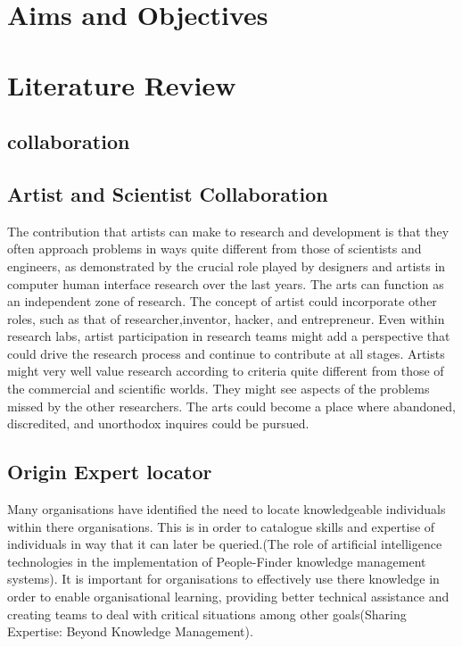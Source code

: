 \documentclass[a4paper,oneside,11pt]{report}
\begin{document}
\tableofcontents


\chapter{Aims and Objectives}
\chapter{Literature Review}
\section{collaboration}
\section{Artist and Scientist Collaboration}
The contribution that artists can make to research and development is that they often
approach problems in ways quite different from those of scientists and engineers, as
demonstrated by the crucial role played by designers and artists in computer human
interface research over the last years. The arts can function as an independent zone of
research. The concept of artist could incorporate other roles, such as that of researcher,inventor, hacker, and entrepreneur. Even within research labs, artist participation in
research teams might add a perspective that could drive the research process and continue
to contribute at all stages. Artists might very well value research according to criteria quite different from those of the commercial and scientiﬁc worlds. They might see aspects of the problems missed by the other researchers. The arts could become a place where abandoned, discredited,
and unorthodox inquires could be pursued.
\section{Origin Expert locator}
Many organisations have identified the need to locate knowledgeable individuals within there organisations. This is in order to catalogue skills and expertise of individuals in way that it can later be queried.(The role of artificial intelligence technologies in the implementation of People-Finder knowledge management systems).
It is important for organisations to effectively use there knowledge in order to enable organisational learning, providing better technical assistance and creating teams to deal with critical situations among other goals(Sharing Expertise: Beyond Knowledge Management).
\end{document}
